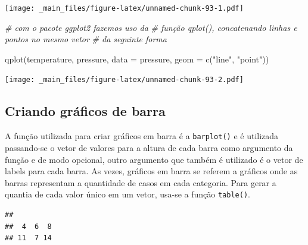 \documentclass[
]{book}
\newenvironment{Shaded}{\begin{snugshade}}{\end{snugshade}}
\newcommand{\AttributeTok}[1]{\textcolor[rgb]{0.77,0.63,0.00}{#1}}
\newcommand{\CommentTok}[1]{\textcolor[rgb]{0.56,0.35,0.01}{\textit{#1}}}
\newcommand{\DocumentationTok}[1]{\textcolor[rgb]{0.56,0.35,0.01}{\textbf{\textit{#1}}}}
\newcommand{\FunctionTok}[1]{\textcolor[rgb]{0.00,0.00,0.00}{#1}}
\newcommand{\NormalTok}[1]{#1}
\newcommand{\SpecialCharTok}[1]{\textcolor[rgb]{0.00,0.00,0.00}{#1}}
\newcommand{\StringTok}[1]{\textcolor[rgb]{0.31,0.60,0.02}{#1}}
\begin{document}
\texttt{[image: \_main\_files/figure-latex/unnamed-chunk-93-1.pdf]}

\begin{Shaded}
\begin{Highlighting}[]
\CommentTok{\# com o pacote ggplot2 fazemos uso da}
\CommentTok{\# função qplot(), concatenando linhas e pontos no mesmo vetor}
\CommentTok{\# da seguinte forma}

\FunctionTok{qplot}\NormalTok{(temperature, pressure, }\AttributeTok{data =}\NormalTok{ pressure, }\AttributeTok{geom =} \FunctionTok{c}\NormalTok{(}\StringTok{"line"}\NormalTok{,}
\StringTok{"point"}\NormalTok{))}
\end{Highlighting}
\end{Shaded}

\texttt{[image: \_main\_files/figure-latex/unnamed-chunk-93-2.pdf]}

\hypertarget{criando-gruxe1ficos-de-barra}{%
\subsection{Criando gráficos de barra}\label{criando-gruxe1ficos-de-barra}}

A função utilizada para criar gráficos em barra é a \texttt{barplot()} e é utilizada passando-se o vetor de valores para a altura de cada barra como argumento da função e de modo opcional, outro argumento que também é utilizado é o vetor de labels para cada barra. As vezes, gráficos em barra se referem a gráficos onde as barras representam a quantidade de casos em cada categoria. Para gerar a quantia de cada valor único em um vetor, usa-se a função \texttt{table()}.

\begin{Shaded}
\end{Shaded}

\begin{verbatim}
## 
##  4  6  8 
## 11  7 14
\end{verbatim}

\begin{Shaded}
\end{Shaded}
\end{document}
